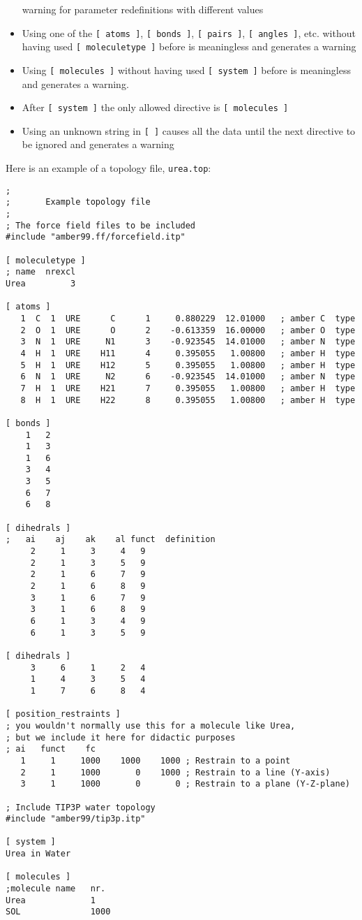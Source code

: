 \begin{itemize}
      warning for parameter redefinitions with different values
\item Using one of the {\tt [~atoms~]}, {\tt [~bonds~]},
      {\tt [~pairs~]}, {\tt [~angles~]}, etc. without having used
      {\tt [~moleculetype~]}
      before is meaningless and generates a warning
\item Using {\tt [~molecules~]} without having used
      {\tt [~system~]} before is meaningless and generates a warning.
\item After {\tt [~system~]} the only allowed directive is {\tt [~molecules~]}
\item Using an unknown string in {\tt [ ]} causes all the data until
      the next directive to be ignored and generates a warning
\end{itemize}

Here is an example of a topology file, {\tt urea.top}:

{\small
\begin{verbatim}
;
;       Example topology file
;
; The force field files to be included
#include "amber99.ff/forcefield.itp"

[ moleculetype ]
; name  nrexcl
Urea         3

[ atoms ]
   1  C  1  URE      C      1     0.880229  12.01000   ; amber C  type
   2  O  1  URE      O      2    -0.613359  16.00000   ; amber O  type
   3  N  1  URE     N1      3    -0.923545  14.01000   ; amber N  type
   4  H  1  URE    H11      4     0.395055   1.00800   ; amber H  type
   5  H  1  URE    H12      5     0.395055   1.00800   ; amber H  type
   6  N  1  URE     N2      6    -0.923545  14.01000   ; amber N  type
   7  H  1  URE    H21      7     0.395055   1.00800   ; amber H  type
   8  H  1  URE    H22      8     0.395055   1.00800   ; amber H  type

[ bonds ]
    1	2
    1	3	
    1   6
    3	4
    3	5
    6	7
    6	8

[ dihedrals ] 
;   ai    aj    ak    al funct  definition
     2     1     3     4   9     
     2     1     3     5   9     
     2     1     6     7   9     
     2     1     6     8   9     
     3     1     6     7   9     
     3     1     6     8   9     
     6     1     3     4   9     
     6     1     3     5   9     

[ dihedrals ] 
     3     6     1     2   4     
     1     4     3     5   4	 
     1     7     6     8   4

[ position_restraints ]
; you wouldn't normally use this for a molecule like Urea,
; but we include it here for didactic purposes
; ai   funct    fc
   1     1     1000    1000    1000 ; Restrain to a point
   2     1     1000       0    1000 ; Restrain to a line (Y-axis)
   3     1     1000       0       0 ; Restrain to a plane (Y-Z-plane)

; Include TIP3P water topology
#include "amber99/tip3p.itp"

[ system ]
Urea in Water

[ molecules ]
;molecule name   nr.
Urea             1
SOL              1000
\end{verbatim}}

